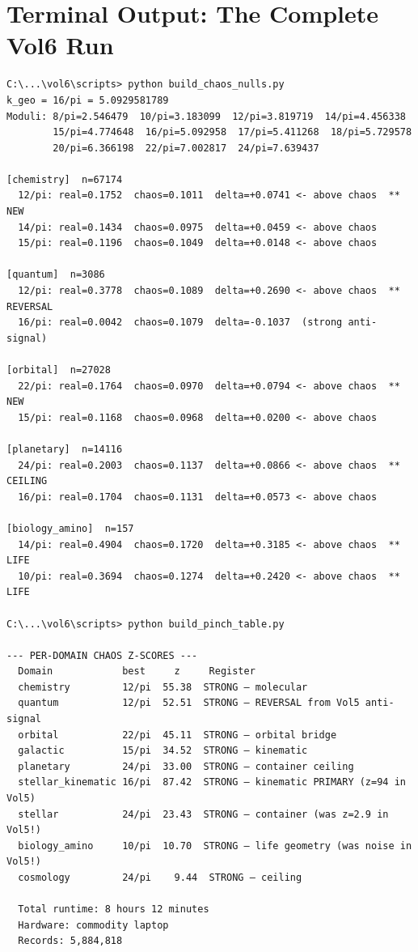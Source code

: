 \documentclass[11pt, letterpaper, openany]{book}
\begin{document}
\section{Terminal Output: The Complete Vol6 Run}

\begin{lstlisting}[style=terminal]
C:\...\vol6\scripts> python build_chaos_nulls.py
k_geo = 16/pi = 5.0929581789
Moduli: 8/pi=2.546479  10/pi=3.183099  12/pi=3.819719  14/pi=4.456338
        15/pi=4.774648  16/pi=5.092958  17/pi=5.411268  18/pi=5.729578
        20/pi=6.366198  22/pi=7.002817  24/pi=7.639437

[chemistry]  n=67174
  12/pi: real=0.1752  chaos=0.1011  delta=+0.0741 <- above chaos  ** NEW
  14/pi: real=0.1434  chaos=0.0975  delta=+0.0459 <- above chaos
  15/pi: real=0.1196  chaos=0.1049  delta=+0.0148 <- above chaos

[quantum]  n=3086
  12/pi: real=0.3778  chaos=0.1089  delta=+0.2690 <- above chaos  ** REVERSAL
  16/pi: real=0.0042  chaos=0.1079  delta=-0.1037  (strong anti-signal)

[orbital]  n=27028
  22/pi: real=0.1764  chaos=0.0970  delta=+0.0794 <- above chaos  ** NEW
  15/pi: real=0.1168  chaos=0.0968  delta=+0.0200 <- above chaos

[planetary]  n=14116
  24/pi: real=0.2003  chaos=0.1137  delta=+0.0866 <- above chaos  ** CEILING
  16/pi: real=0.1704  chaos=0.1131  delta=+0.0573 <- above chaos

[biology_amino]  n=157
  14/pi: real=0.4904  chaos=0.1720  delta=+0.3185 <- above chaos  ** LIFE
  10/pi: real=0.3694  chaos=0.1274  delta=+0.2420 <- above chaos  ** LIFE

C:\...\vol6\scripts> python build_pinch_table.py

--- PER-DOMAIN CHAOS Z-SCORES ---
  Domain            best     z     Register
  chemistry         12/pi  55.38  STRONG — molecular
  quantum           12/pi  52.51  STRONG — REVERSAL from Vol5 anti-signal
  orbital           22/pi  45.11  STRONG — orbital bridge
  galactic          15/pi  34.52  STRONG — kinematic
  planetary         24/pi  33.00  STRONG — container ceiling
  stellar_kinematic 16/pi  87.42  STRONG — kinematic PRIMARY (z=94 in Vol5)
  stellar           24/pi  23.43  STRONG — container (was z=2.9 in Vol5!)
  biology_amino     10/pi  10.70  STRONG — life geometry (was noise in Vol5!)
  cosmology         24/pi    9.44  STRONG — ceiling

  Total runtime: 8 hours 12 minutes
  Hardware: commodity laptop
  Records: 5,884,818
\end{lstlisting}
\end{document}
